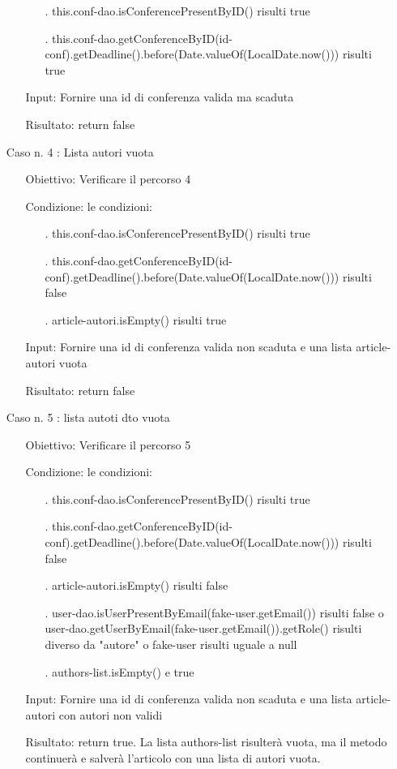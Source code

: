 \begin{itemize}
\begin{itemize}
\begin{itemize}
\item[.]  this.conf-dao.isConferencePresentByID() risulti true
\item[.]  this.conf-dao.getConferenceByID(id-conf).getDeadline().before(Date.valueOf(LocalDate.now())) risulti true 
\end{itemize}
\item[Input:] Fornire una id di conferenza valida ma scaduta
\item[Risultato:] return false
\end{itemize}
\item[Caso n. 4 :] Lista autori vuota
\begin{itemize}
\item[Obiettivo:] Verificare il percorso  4
\item[Condizione:] le condizioni:
\begin{itemize}
\item[.]  this.conf-dao.isConferencePresentByID() risulti true
\item[.]  this.conf-dao.getConferenceByID(id-conf).getDeadline().before(Date.valueOf(LocalDate.now())) risulti false
\item[.] article-autori.isEmpty() risulti true
\end{itemize}
\item[Input:] Fornire una id di conferenza valida non scaduta e una lista article-autori vuota 
\item[Risultato:] return false
\end{itemize}
\item[Caso n. 5 :] lista autoti dto vuota
\begin{itemize}
\item[Obiettivo:] Verificare il percorso 5
\item[Condizione:] le condizioni: 
\begin{itemize}
\item[.]  this.conf-dao.isConferencePresentByID() risulti true
\item[.]  this.conf-dao.getConferenceByID(id-conf).getDeadline().before(Date.valueOf(LocalDate.now())) risulti false
\item[.] article-autori.isEmpty() risulti false
\item[.] user-dao.isUserPresentByEmail(fake-user.getEmail()) risulti false o user-dao.getUserByEmail(fake-user.getEmail()).getRole() risulti diverso da "autore" o  fake-user risulti uguale a null
\item[.] authors-list.isEmpty() e true
\end{itemize}
\item[Input:]  Fornire una id di conferenza valida non scaduta e una lista article-autori con autori non validi
\item[Risultato:] return true. La lista authors-list risulterà vuota, ma il metodo continuerà e salverà l'articolo con una lista di autori vuota.
\end{itemize}
\end{itemize}



